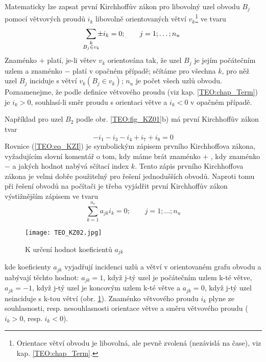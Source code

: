       Matematicky lze zapsat první Kirchhoffův zákon pro libovolný uzel obvodu \(B_j\) pomocí 
      větvových proudů \(i_k\) libovolně orientovaných větví \(v_k\)\footnote{Orientace větví 
      obvodu je libovolná, ale pevně zvolená (nezávislá na čase), viz kap. \ref{TEO:chap_Term}.} ve 
      tvaru 
      \cite[s.~47]{Meyer1978}
      \begin{equation}\label{TEO:eq_KZI}
        \sum_{\mathclap{\substack{k\\B_j\in v_k}}} \pm i_k = 0; \qquad j = 1;\ldots; n_u 
      \end{equation}
      Znaménko \(+\) platí, je-li větev \(v_k\) orientována tak, že uzel \(B_j\) je jejím 
      počátečním uzlem a znaménko \(-\) platí v opačném případě; sčítáme pro všechna \(k\), pro něž 
      uzel \(B_j\) inciduje s větví \(v_k (B_j\in v_k)\); \(n_u\) je počet všech uzlů obvodu. 
      Poznamenejme, že podle definice větvového proudu (viz kap. \ref{TEO:chap_Term}) je \(i_k > 
      0\), souhlasí-li směr proudu s orientaci větve a \(i_k < 0\) v opačném případě.
      
      Například pro uzel \(B_2\) podle obr. \ref{TEO:fig_KZ01}b) má první Kirchhoffův zákon tvar
      \begin{equation*}
        -i_1 - i_3 - i_4 + i_7 + i_8 = 0
      \end{equation*}
      Rovnice (\ref{TEO:eq_KZI}) je symbolickým zápisem prvního Kirchhoffova zákona, vyžadujícím 
      slovní komentář o tom, kdy máme brát znaménko \(+\) , kdy znaménko \(-\) a jakých hodnot 
      nabývá sčítací index \(k\). Tento zápis prvního Kirchhoffova zákona je velmi dobře použitelný 
      pro řešení jednodušších obvodů. Naproti tomu při řešení obvodů na počítači je třeba vyjádřit 
      první Kirchhoffův zákon výstižnějším zápisem ve tvaru
      \begin{equation}\label{TEO:eq_KZI_01}
        \sum\limits_{k=1}^{n_v} a_{jk} i_k = 0; \qquad j = 1;\ldots; n_u 
      \end{equation}
      \begin{figure}[ht!]
        \centering
        \texttt{[image: TEO\_KZ02.jpg]}
        \caption{K určení hodnot koeficientů \(a_{jk}\) \cite[s.~47]{Meyer1978}}
        \label{TEO:fig_KZ02}
      \end{figure}
      kde koeficienty \(a_{jk}\) vyjadřují incidenci uzlů a větví v orientovaném grafu obvodu a 
      nabývají těchto hodnot: \(a_{jk} = 1\), když j-tý uzel je počátečním uzlem k-té větve, 
      \(a_{jk} = - 1\), když j-tý uzel je koncovým uzlem k-té větve a \(a_{jk} = 0\), když j-tý 
      uzel neinciduje s k-tou větví (obr. \ref{TEO:fig_KZ02}). Znaménko větvového proudu \(i_k\) 
      plyne ze souhlasnosti, resp. nesouhlasnosti orientace větve a směru větvového proudu (\(i_k > 
      0\), resp. \(i_k < 0\)).
      
